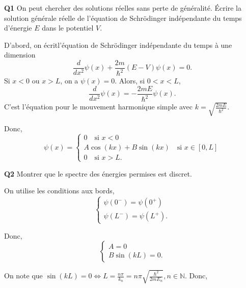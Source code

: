 \documentclass[french]{article}
\begin{document}
	{%
		\begin{tcolorbox}[colback=gray!5!white,colframe=gray!75!black]
			\textbf{\large{Q1}} On peut chercher des solutions réelles sans perte de généralité. Écrire la solution générale réelle de l'équation de Schrödinger indépendante du temps d'énergie $E$ dans le potentiel $V$.
		\end{tcolorbox}
	D'abord, on écritl'équation de Schrödinger indépendante du temps à une dimension
	\begin{equation}
		\frac{d}{dx^2}\psi(x) + \frac{2m}{\hbar^2}(E -V)\psi(x) = 0.
	\end{equation}
	Si $x < 0$ ou $x > L$, on a $\psi(x) = 0$.
	Alors, si $0 < x < L$,
	\begin{equation}
		\frac{d}{dx^2}\psi(x) = -\frac{2mE}{\hbar^2}\psi(x).
	\end{equation}
	C'est l'équation pour le mouvement harmonique simple avec $k = \sqrt{\frac{2mE}{\hbar^2}}$.
	
	Donc,
	\begin{equation}
		\psi(x) = \begin{cases}
			0 \quad \text{si $x < 0$}\\
			A\cos(kx) + B\sin(kx) \quad \text{si $x \in [0,L]$}\\
			0 \quad \text{si $x > L$}.
		\end{cases}
	\end{equation}
	
	\begin{tcolorbox}[colback=gray!5!white,colframe=gray!75!black]
		\textbf{\large{Q2}} Montrer que le spectre des énergies permises est discret.
	\end{tcolorbox}

	On utilise les conditions aux bords,
	\begin{equation}
		\begin{cases}
		\psi(0^-) = \psi(0^+)\\
		\psi(L^-) = \psi(L^+).
		\end{cases}
	\end{equation}
	
	Donc,
	\begin{equation}
	\begin{cases}
	A = 0\\
	B\sin(kL) = 0.
	\end{cases}
	\end{equation}
	
	On note que $\sin(kL) = 0 \iff L = \frac{n\pi}{k_n} = n\pi \sqrt{\frac{\hbar^2}{2mE_n}} , n\in \mathbb{N}$. Donc,
	
}
\end{document}
